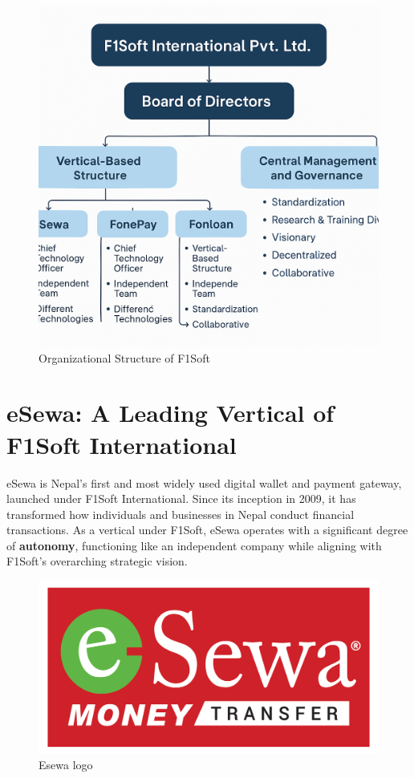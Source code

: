 \documentclass[12pt, a4paper]{report}
\begin{document}
\begin{figure}[h]
\centering
\includegraphics[scale=0.3]{images/structure.png}
\caption{Organizational Structure of F1Soft}
\end{figure}
\vspace{18pt}
\section{eSewa: A Leading Vertical of F1Soft International}
eSewa is Nepal’s first and most widely used digital wallet and payment gateway, launched under F1Soft International. Since its inception in 2009, it has transformed how individuals and businesses in Nepal conduct financial transactions. As a vertical under F1Soft, eSewa operates with a significant degree of \textbf{autonomy}, functioning like an independent company while aligning with F1Soft’s overarching strategic vision.

\begin{figure}
\centering
\includegraphics[scale=0.3]{images/esewa.png}
\caption{Esewa logo}
\end{figure}
\end{document}
